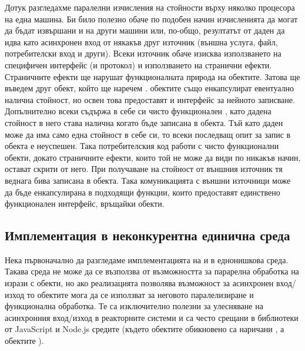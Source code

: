Дотук разгледахме паралелни изчисления на стойности върху няколко процесора на една машина. Би било полезно обаче по подобен начин изчисленията да могат да бъдат извършани и на други машини или, по-общо, резултатът от даден  да идва като асинхронен вход от някакъв друг източник (външна услуга, файл, потребителски вход и други). Всеки източник обаче изисква използването на специфичен интерфейс (и протокол) и използването на странични ефекти. Страничните ефекти ще нарушат функционалната природа на  обектите. Затова ще въведем друг обект, който ще наречем .  обектите също енкапсулират евентуално налична стойност, но освен това предоставят и интерфейс за нейното записване. Допълнително всеки  съдържа в себе си чисто функционален , като дадена стойност в него става налична когато бъде записана в  обекта. Тъй като даден  може да има само една стойност в себе си, то всеки последващ опит за запис в  обекта е неуспешен. Така потребителския код работи с чисто функционални  обекти, докато страничните ефекти, които той не може да види по никакъв начин, остават скрити от него. При получаване на стойност от външния източник тя веднага бива записана в  обекта. Така комуникацията с външни източници може да бъде енкапсулирана в подходящи функции, които предоставят единствено функционален интерфейс, връщайки  обекти.

\subsection{Имплементация в неконкурентна единична среда}

Нека първоначално да разгледаме имплементацията на  и  в еднонишкова среда. Такава среда не може да се възползва от възможността за парарелна обработка на изрази с  обекти, но ако реализацията позволява възможност за асинхронен вход/изход то  обектите мога да се използват за неговото паралелизиране и функционална обработка. Те са изключително полезни за улесняване на асинхронния вход/изход в реакторните системи и са често срещани в библиотеки от JavaScript и Node.js средите (където  обектите обикновено са наричани , а  обектите ).

